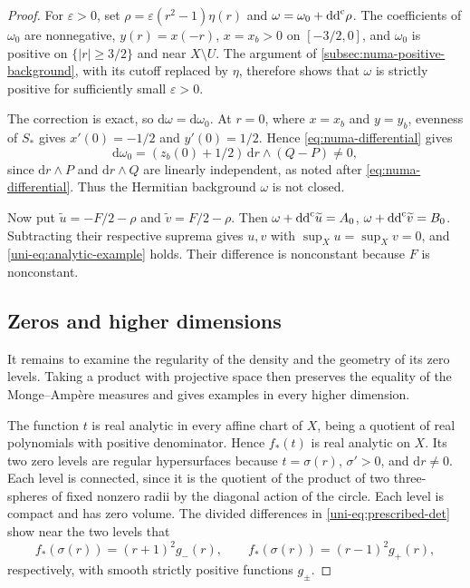 \begin{proof}
For $\varepsilon>0$, set $\rho=\varepsilon(r^2-1)\eta(r)$ and $\omega=\omega_0+\mathrm{dd}^{\mathrm{c}}\rho$. The coefficients of $\omega_0$ are nonnegative, $y(r)=x(-r)$, $x=x_b>0$ on $[-3/2,0]$, and $\omega_0$ is positive on $\{|r|\geq3/2\}$ and near $X\setminus U$. The argument of \cref{subsec:numa-positive-background}, with its cutoff replaced by $\eta$, therefore shows that $\omega$ is strictly positive for sufficiently small $\varepsilon>0$.

The correction is exact, so $\mathrm{d}\omega=\mathrm{d}\omega_0$.  At $r=0$, where $x=x_b$ and $y=y_b$,
evenness of $S_*$ gives $x'(0)=-1/2$ and $y'(0)=1/2$.  Hence
\eqref{eq:numa-differential} gives
\[
 \mathrm{d}\omega_0=(z_b(0)+1/2)\,\mathrm{d}r\wedge(Q-P)\ne0,
\]
since $\mathrm{d}r\wedge P$ and $\mathrm{d}r\wedge Q$ are linearly independent, as noted after \eqref{eq:numa-differential}. Thus the Hermitian background $\omega$
is not closed.

Now put $\widetilde u=-F/2-\rho$ and
$\widetilde v=F/2-\rho$.  Then
$\omega+\mathrm{dd}^{\mathrm{c}}\widetilde u=A_0$,
$\omega+\mathrm{dd}^{\mathrm{c}}\widetilde v=B_0$.
Subtracting their respective suprema gives $u,v$ with $\sup_Xu=\sup_Xv=0$, and \eqref{uni-eq:analytic-example} holds.  Their difference is nonconstant because $F$
is nonconstant.

\subsection{Zeros and higher dimensions}

It remains to examine the regularity of the density and the geometry of its zero levels. Taking a product with projective space then preserves the equality of the Monge--Amp\`ere measures and gives examples in every higher dimension.

The function $t$ is real analytic in every affine chart of $X$, being a
quotient of real polynomials with positive denominator.  Hence $f_*(t)$
is real analytic on $X$.  Its two zero levels are regular hypersurfaces because
$t=\sigma(r)$, $\sigma'>0$, and $\mathrm{d}r\ne0$.
Each level is connected, since it is the quotient of the product of two
three-spheres of fixed nonzero radii by the diagonal action of the circle.
Each level is compact and has zero volume.  The divided
differences in \eqref{uni-eq:prescribed-det} show near the two levels that
\begin{equation}\label{uni-eq:quadratic-zero}
 f_*(\sigma(r))=(r+1)^2g_-(r),\qquad
 f_*(\sigma(r))=(r-1)^2g_+(r),
\end{equation}
respectively, with smooth strictly positive functions $g_\pm$.


\end{proof}
